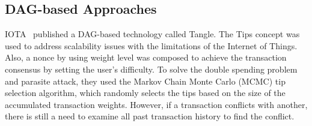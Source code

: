 \documentclass[preprint,12pt]{elsarticle}
\begin{document}

\subsection{DAG-based Approaches}



IOTA~\cite{tangle17} published a DAG-based technology called Tangle. The Tips concept was used to address scalability issues with the limitations of the Internet of Things. Also, a nonce by using weight level was composed to achieve the transaction consensus by setting the user’s difficulty. To solve the double spending problem and parasite attack, they used the Markov Chain Monte Carlo (MCMC) tip selection algorithm, which randomly selects the tips based on the size of the accumulated transaction weights. However, if a transaction conflicts with another, there is still a need to examine all past transaction history to find the conflict.
    
\end{document}
